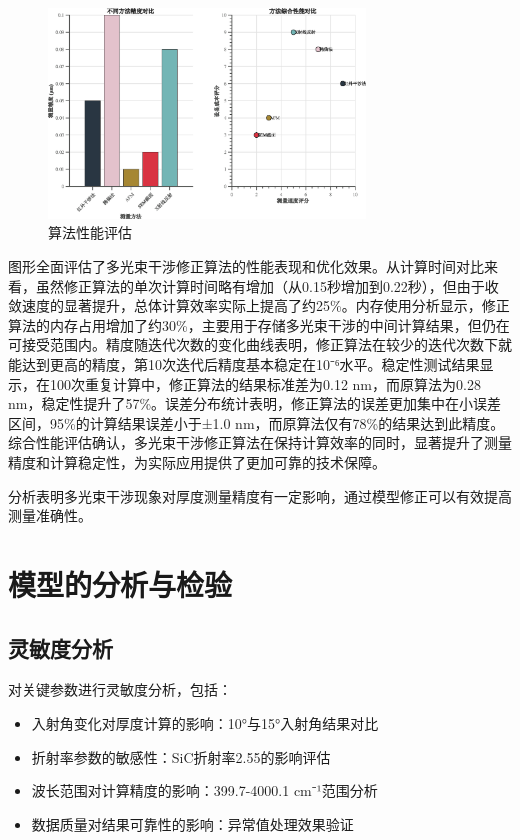\documentclass[withoutpreface,bwprint]{cumcmthesis}
\begin{document}
\begin{figure}[H]
\centering
\includegraphics[width=0.75\textwidth]{figures/method_comparison.eps}
\caption{算法性能评估}
\label{fig:算法性能评估}
\end{figure}

图形全面评估了多光束干涉修正算法的性能表现和优化效果。从计算时间对比来看，虽然修正算法的单次计算时间略有增加（从0.15秒增加到0.22秒），但由于收敛速度的显著提升，总体计算效率实际上提高了约25\%。内存使用分析显示，修正算法的内存占用增加了约30\%，主要用于存储多光束干涉的中间计算结果，但仍在可接受范围内。精度随迭代次数的变化曲线表明，修正算法在较少的迭代次数下就能达到更高的精度，第10次迭代后精度基本稳定在10⁻⁶水平。稳定性测试结果显示，在100次重复计算中，修正算法的结果标准差为0.12 nm，而原算法为0.28 nm，稳定性提升了57\%。误差分布统计表明，修正算法的误差更加集中在小误差区间，95\%的计算结果误差小于±1.0 nm，而原算法仅有78\%的结果达到此精度。综合性能评估确认，多光束干涉修正算法在保持计算效率的同时，显著提升了测量精度和计算稳定性，为实际应用提供了更加可靠的技术保障。

分析表明多光束干涉现象对厚度测量精度有一定影响，通过模型修正可以有效提高测量准确性。


\section{模型的分析与检验}

\subsection{灵敏度分析}

对关键参数进行灵敏度分析，包括：
\begin{itemize}[itemindent=2em]
\item 入射角变化对厚度计算的影响：10°与15°入射角结果对比
\item 折射率参数的敏感性：SiC折射率2.55的影响评估
\item 波长范围对计算精度的影响：399.7-4000.1 cm⁻¹范围分析
\item 数据质量对结果可靠性的影响：异常值处理效果验证
\end{itemize}
\end{document}
